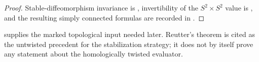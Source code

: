 \begin{proof}
Stable-diffeomorphism invariance is \cite[Theorem~A]{Reutter2023},
invertibility of the $S^2\times S^2$ value is
\cite[Theorem~3.5]{Reutter2023}, and the resulting simply connected formulas
are recorded in \cite[Corollary~3.9]{Reutter2023}.
\end{proof}

\begin{remark}
\label{rem:twisted-stabilization-use}
 supplies the marked topological input
needed later.  Reutter's theorem is cited as the untwisted precedent for the
stabilization strategy; it does not by itself prove any statement about the
homologically twisted evaluator.
\end{remark}
